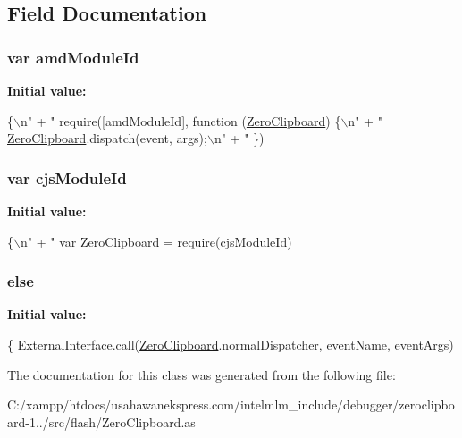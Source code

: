 \subsection{Field Documentation}
\hypertarget{class_zero_clipboard_a1597a6c2968adbfb1d8568cc63a09dff}{
\subsubsection[{amd\-Module\-Id}]{\setlength{\rightskip}{0pt plus 5cm}var amd\-Module\-Id\hspace{0.3cm}{\ttfamily [static]}}}\label{class_zero_clipboard_a1597a6c2968adbfb1d8568cc63a09dff}
{\bfseries Initial value\-:}
\begin{DoxyCode}
\{\(\backslash\)n\textcolor{stringliteral}{" +}
\textcolor{stringliteral}{      "}  require([amdModuleId], \textcolor{keyword}{function} (\hyperlink{class_zero_clipboard}{ZeroClipboard}) \{\(\backslash\)n\textcolor{stringliteral}{" +}
\textcolor{stringliteral}{      "}    \hyperlink{class_zero_clipboard}{ZeroClipboard}.dispatch(event, args);\(\backslash\)n\textcolor{stringliteral}{" +}
\textcolor{stringliteral}{      "}  \})
\end{DoxyCode}
\hypertarget{class_zero_clipboard_aab9e7c5550792834df15930d7bc0a732}{
\subsubsection[{cjs\-Module\-Id}]{\setlength{\rightskip}{0pt plus 5cm}var cjs\-Module\-Id\hspace{0.3cm}{\ttfamily [static]}}}\label{class_zero_clipboard_aab9e7c5550792834df15930d7bc0a732}
{\bfseries Initial value\-:}
\begin{DoxyCode}
\{\(\backslash\)n\textcolor{stringliteral}{" +}
\textcolor{stringliteral}{      "}  var \hyperlink{class_zero_clipboard}{ZeroClipboard} = require(cjsModuleId)
\end{DoxyCode}
\hypertarget{class_zero_clipboard_a0544c3fe466e421738dae463968b70ba}{
\subsubsection[{else}]{\setlength{\rightskip}{0pt plus 5cm}else}}\label{class_zero_clipboard_a0544c3fe466e421738dae463968b70ba}
{\bfseries Initial value\-:}
\begin{DoxyCode}
\{
        ExternalInterface.call(\hyperlink{class_zero_clipboard}{ZeroClipboard}.normalDispatcher, eventName, eventArgs)
\end{DoxyCode}


The documentation for this class was generated from the following file\-:\begin{DoxyCompactItemize}
\item 
C\-:/xampp/htdocs/usahawanekspress.\-com/intelmlm\-\_\-include/debugger/zeroclipboard-\/1../src/flash/Zero\-Clipboard.\-as\end{DoxyCompactItemize}

